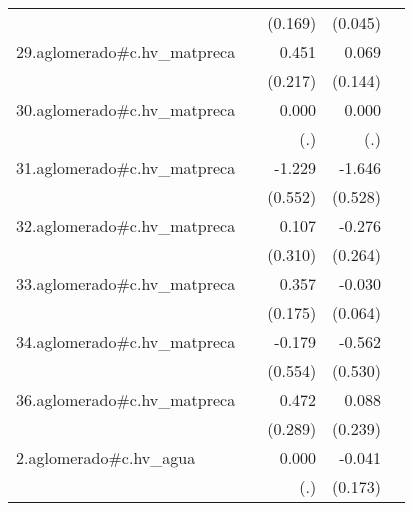 {\begin{longtable}{l*{4}{D{.}{.}{-1}}}
            &                     &     (0.169)         &     (0.045)         &                     \\
\addlinespace
29.aglomerado#c.hv\_matpreca&                     &       0.451\sym{*}  &       0.069         &                     \\
            &                     &     (0.217)         &     (0.144)         &                     \\
\addlinespace
30.aglomerado#c.hv\_matpreca&                     &       0.000         &       0.000         &                     \\
            &                     &         (.)         &         (.)         &                     \\
\addlinespace
31.aglomerado#c.hv\_matpreca&                     &      -1.229\sym{*}  &      -1.646\sym{**} &                     \\
            &                     &     (0.552)         &     (0.528)         &                     \\
\addlinespace
32.aglomerado#c.hv\_matpreca&                     &       0.107         &      -0.276         &                     \\
            &                     &     (0.310)         &     (0.264)         &                     \\
\addlinespace
33.aglomerado#c.hv\_matpreca&                     &       0.357\sym{*}  &      -0.030         &                     \\
            &                     &     (0.175)         &     (0.064)         &                     \\
\addlinespace
34.aglomerado#c.hv\_matpreca&                     &      -0.179         &      -0.562         &                     \\
            &                     &     (0.554)         &     (0.530)         &                     \\
\addlinespace
36.aglomerado#c.hv\_matpreca&                     &       0.472         &       0.088         &                     \\
            &                     &     (0.289)         &     (0.239)         &                     \\
\addlinespace
2.aglomerado#c.hv\_agua&                     &       0.000         &      -0.041         &                     \\
            &                     &         (.)         &     (0.173)         &                     \\

\end{longtable}}
